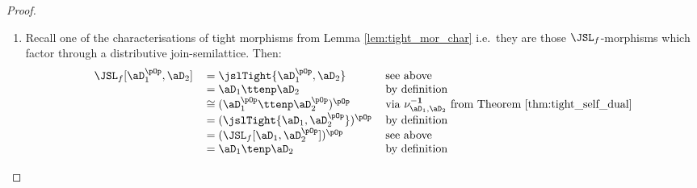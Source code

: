 \documentclass{article}
\begin{document}
\begin{proof}
\item
\begin{enumerate}
\item
Recall one of the characterisations of tight morphisms from Lemma \ref{lem:tight_mor_char} i.e.\ they are those $\JSL_f$-morphisms which factor through a distributive join-semilattice. Then:
\[
\begin{tabular}{lll}
$\JSL_f[\aD_1^{\pOp},\aD_2]$
&
$= \jslTight{\aD_1^{\pOp},\aD_2}$
& see above
\\&
$= \aD_1 \ttenp \aD_2$
& by definition
\\&
$\cong (\aD_1^{\pOp} \ttenp \aD_2^{\pOp})^{\pOp}$
& via $\nu_{\aD_1,\aD_2}^{\bf-1}$ from Theorem \ref{thm:tight_self_dual}
\\&
$= (\jslTight{\aD_1,\aD_2^{\pOp}})^{\pOp}$
& by definition
\\&
$= (\JSL_f[\aD_1,\aD_2^{\pOp}])^{\pOp}$
& see above
\\&
$= \aD_1 \tenp \aD_2$
& by definition
\end{tabular}
\]


\end{enumerate}
\end{proof}
\end{document}
